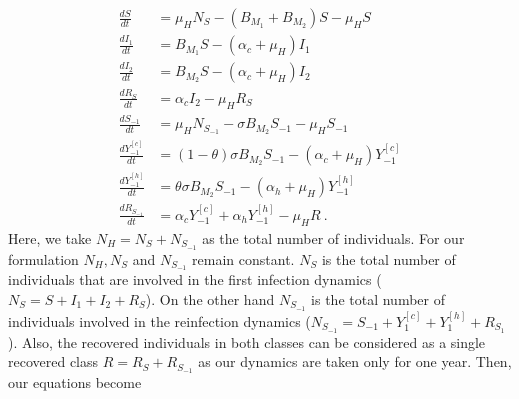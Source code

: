 \begin{equation}\label{eqn:model_two_strains1}
    \begin{aligned}
        \frac{dS}{dt} &=
            \mu_HN_S - (B_{M_1} + B_{M_2}) S
            -\mu_H S
        \\
        \frac{dI_1}{dt} &=
            B_{M_1} S
            -(\alpha_c + \mu_H) I_1
        \\
        \frac{dI_2}{dt} &=
            B_{M_2} S
            -(\alpha_c + \mu_H)I_2
        \\
        \frac{dR_S}{dt}&=\alpha_c I_2-\mu_H R_S
        \\
        \frac{dS_{-1}}{dt} &=
            \mu_HN_{S_{-1}}- \sigma B_{M_2} S_{-1}-\mu_H S_{-1}
        \\
        \frac{dY_{-1} ^{[c]} }{dt} &=
            (1 - \theta) \sigma B_{M_2} S_{-1}
            -(\alpha_c + \mu_H) Y_{-1} ^ {[c]}
        \\
        \frac{dY_{-1}^{[h]}}{dt} &=
            \theta \sigma B_{M_2} S_{-1}
            -(\alpha_h + \mu_H)Y_{-1} ^{[h]} 
        \\
        \frac{dR_{S_{-1}}}{dt} &= 
            \alpha_c Y_{-1} ^{[c]}
            + \alpha_h Y_{-1} ^ {[h]} - \mu_H R \ .
    \end{aligned}
\end{equation}
    Here, we take $N_H=N_S+N_{S_{-1}}$ as the total number of individuals.
    For our formulation $N_H, N_S$ and $N_{S_{-1}}$ remain constant. $N_S$
    is the total number of individuals that are involved in the first
    infection dynamics ($N_S = S +I_1+I_2+R_S$). On the other hand
    $N_{S_{-1}}$ is the total number of individuals involved in the
    reinfection dynamics ($N_{S_{-1}}=S_{-1}+Y_1^{[c]}+
    Y_1^{[h]}+R_{S_1}$). Also, the recovered individuals in both classes
    can be considered as a single recovered class $R=R_S+R_{S_{-1}}$ as
    our dynamics are taken only for one year. Then, our equations become

